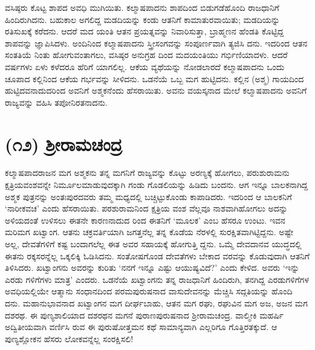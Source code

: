 ವಸಿಷ್ಠರು ಕೊಟ್ಟ ಶಾಪದ ಅವಧಿ ಮುಗಿಯಿತು. ಕಲ್ಮಾಷಪಾದನು ಶಾಪದಿಂದ ಬಿಡುಗಡೆಹೊಂದಿ ರಾಜಧಾನಿಗೆ ಹಿಂದಿರುಗಿದನು. ಬಹುಕಾಲ ಅಗಲಿದ್ದ ಮಡದಿಯನ್ನು ಕಂಡು ಆತನಿಗೆ ಕಾಮಾತುರವಾಯಿತು; ಮಡದಿಯನ್ನು ರತಿಸುಖಕ್ಕೆ ಕರೆದನು. ಆದರೆ ಮದ ಯಂತಿ ಆತನ ಪ್ರಯತ್ನವನ್ನು ನಿವಾರಿಸುತ್ತಾ, ಬ್ರಾಹ್ಮಣನ ಹೆಂಡತಿ ಕೊಟ್ಟಿದ್ದ ಶಾಪವನ್ನು ಜ್ಞಾಪಿಸಿದಳು. ಅಂದಿನಿಂದ ಕಲ್ಮಾಷಪಾದನು ಸ್ತ್ರೀಸಂಗವನ್ನು ಸಂಪೂರ್ಣವಾಗಿ ತ್ಯಜಿಸಿ ದನು. ಇದರಿಂದ ಆತನ ಸಂತತಿಯೆ ನಿಂತು ಹೋಗುವಂತಾಗಲು, ವಸಿಷ್ಠರ ಅನುಗ್ರಹ ದಿಂದ ಮದಯಂತಿಯು ಗರ್ಭಿಣಿಯಾದಳು. ಆದರೆ ವರ್ಷಗಳು ಏಳು ಕಳೆದರೂ ಹೆರಿಗೆ ಯಾಗಲಿಲ್ಲ. ಆಕೆಯ ವ್ಯಥೆಯನ್ನು ನೋಡಲಾರದೆ ಕಲ್ಮಾಷಪಾದನು ಒಂದು ಚೂಪಾದ ಕಲ್ಲಿನಿಂದ ಆಕೆಯ ಗರ್ಭವನ್ನು ಸೀಳಿದನು. ಒಡನೆಯೆ ಒಬ್ಬ ಮಗ ಹುಟ್ಟಿದನು. ಕಲ್ಲಿನ (ಅಶ್ಮ) ಗಾಯದಿಂದ ಹುಟ್ಟಿದವನಾದುದರಿಂದ ಅವನಿಗೆ ಅಶ್ಮಕನೆಂದು ಹೆಸರಾಯಿತು. ಅವನು ವಯಸ್ಕನಾದ ಮೇಲೆ ಕಲ್ಮಾಷಪಾದನು ಅವನಿಗೆ ರಾಜ್ಯವನ್ನು ವಹಿಸಿ ತಪೋನಿರತನಾದನು.


\section{(೧೨) ಶ್ರೀರಾಮಚಂದ್ರ}

ಕಲ್ಮಾಷಪಾದರಾಜನ ಮಗ ಅಶ್ಮಕನು ತನ್ನ ಮಗನಿಗೆ ರಾಜ್ಯವನ್ನು ಕೊಟ್ಟು ಅರಣ್ಯಕ್ಕೆ ಹೋಗಲು, ಪರುಶುರಾಮನು ಕ್ಷತ್ರಿಯವಂಶವನ್ನೇ ನಿರ್ಮೂಲಮಾಡುವುದಕ್ಕಾಗಿ ಗಂಡು ಗೊಡಲಿಯನ್ನು ಹಿಡಿದು ಬಂದನು. ಆಗ ಇನ್ನೂ ಬಾಲಕನಾಗಿದ್ದ ಅಶ್ಮಕ ಪುತ್ರನನ್ನು ಅಂತಃಪುರದವರು ತಮ್ಮ ಮಧ್ಯದಲ್ಲಿ ಬಚ್ಚಿಟ್ಟುಕೊಂಡು ಕಾಪಾಡಿದರು. ಇದರಿಂದ ಆ ಬಾಲಕನಿಗೆ ‘ನಾರೀಕವಚ’ ಎಂದು ಹೆಸರಾಯಿತು. ಪರಶುರಾಮನಿಂದ ಕ್ಷತ್ರಿಯ ವಂಶ ವೆಲ್ಲವೂ ನಾಶವಾಗಿಹೋಗಲು ಅದನ್ನು ಅಳಿಯದಂತೆ ಉಳಿಸಲು ಈತನೇ ಕಾರಣನಾದುದ ರಿಂದ ಈತನಿಗೆ ‘ಮೂಲಕ’ ಎಂಬ ಹೆಸರೂ ಉಂಟು. ಇವನ ಮರಿಮಗ ಖಟ್ವಾಂಗ. ಆತನು ಚಕ್ರವರ್ತಿಯಾಗಿ ಜಗತ್ತನೆಲ್ಲ ತನ್ನ ಕೊಡೆಯ ನೆರಳಲ್ಲಿ ಸುರಕ್ಷಿತವಾಗಿಟ್ಟಿದ್ದನು. ಅಷ್ಟೇ ಅಲ್ಲ, ದೇವತೆಗಳಿಗೆ ಕಷ್ಟ ಬಂದಾಗಲೆಲ್ಲ ಈತ ಅವರ ಸಹಾಯಕ್ಕೆ ಹೋಗುತ್ತಿ ದ್ದನು. ಒಮ್ಮೆ ದೇವದಾನವ ಯುದ್ಧದಲ್ಲಿ ಈತನು ರಕ್ಕಸರನ್ನೆಲ್ಲ ಒಕ್ಕಲಿಕ್ಕಿ ಓಡಿಸಿದನು. ಸಂತೋಷಗೊಂಡ ದೇವತೆಗಳು ಬೇಕಾದ ವರವನ್ನು ಕೊಡುವುದಾಗಿ ಆತನಿಗೆ ತಿಳಿಸಿದರು. ಖಟ್ವಾಂಗನು ಅವರನ್ನು ಕುರಿತು ‘ನನಗೆ ಇನ್ನೂ ಎಷ್ಟು ಆಯುಷ್ಯವಿದೆ?’ ಎಂದು ಕೇಳಿದ. ಅವರು ‘ಇನ್ನು ಎರಡು ಗಳಿಗೆಗಳು ಮಾತ್ರ’ ಎಂದರು. ಒಡನೆಯೆ ಖಟ್ವಾಂಗನು ತನ್ನ ರಾಜಧಾನಿಗೆ ಹಿಂದಿರುಗಿ, ತನಗಿದ್ದ ಎರಡುಗಳಿಗೆಗಳ ಅವಧಿಯಲ್ಲಿಯೇ ಆತ್ಮಾನು ಸಂಧಾನದಿಂದ ಪರಮಪುರುಷನಾದ ವಾಸುದೇವನನ್ನು ಮೆಚ್ಚಿಸಿ ಸದ್ಗತಿಯನ್ನು ಹೊಂದಿ ದನು. ಮಹಾನುಭಾವನಾದ ಖಟ್ವಾಂಗನ ಮಗ ದೀರ್ಘಬಾಹು, ಆತನ ಮಗ ರಘು, ರಘುವಿನ ಮಗ ಅಜ, ಅಜನ ಮಗ ದಶರಥ. ಈ ಪುಣ್ಯಶಾಲಿಯಾದ ದಶರಥನ ಮಗನೆ ಪುರಾಣಪುರುಷನಾದ ಶ್ರೀರಾಮಚಂದ್ರ. ವಾಲ್ಮೀಕಿ ಮಹರ್ಷಿ ಅದ್ವಿತೀಯವಾಗಿ ವರ್ಣಿಸಿ ರುವ ಈ ಪುರುಷೋತ್ತಮನ ಕಥೆ ಸಾಮಾನ್ಯವಾಗಿ ಎಲ್ಲರಿಗೂ ಗೊತ್ತಿರತಕ್ಕುದೆ. ಆ ಪುಣ್ಯಶ್ಲೋಕನ ಹೆಸರು ಲೋಕವನ್ನೆಲ್ಲ ಸಂರಕ್ಷಿಸಲಿ!

